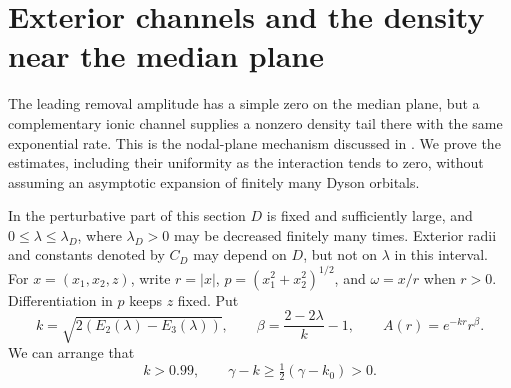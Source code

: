 \section{Exterior channels and the density near the median plane}
\label{sec:channels}

The leading removal amplitude has a simple zero on the median plane,
but a complementary ionic channel supplies a nonzero density tail
there with the same exponential rate.  This is the nodal-plane
mechanism discussed in \cite[Section~V.A]{GGB}.  We prove the estimates,
including their uniformity as the interaction tends to zero, without
assuming an asymptotic expansion of finitely many Dyson orbitals.

In the perturbative part of this section \(D\) is fixed and sufficiently
large, and \(0\leq\lambda\leq\lambda_D\), where \(\lambda_D>0\) may be
decreased finitely many times.  Exterior radii and constants denoted
by \(C_D\) may depend on \(D\), but not on \(\lambda\) in this interval.
For \(x=(x_1,x_2,z)\), write \(r=|x|\),
\(p=(x_1^2+x_2^2)^{1/2}\), and \(\omega=x/r\) when \(r>0\).
Differentiation in \(p\) keeps \(z\) fixed.  Put
\begin{equation}
 k=\sqrt{2(E_2(\lambda)-E_3(\lambda))},\qquad
 \beta=\frac{2-2\lambda}{k}-1,\qquad A(r)=e^{-kr}r^\beta.
 \label{eq:channel-radial-factor}
\end{equation}
We can arrange that
\begin{equation}
 k>0.99,\qquad \gamma-k\geq\tfrac12(\gamma-k_0)>0.
 \label{eq:channel-rate-separation}
\end{equation}

